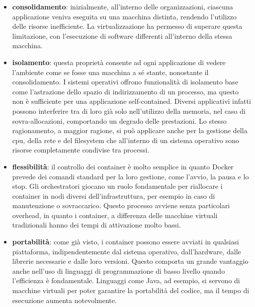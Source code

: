 \begin{itemize}
	\item \textbf{consolidamento}: inizialmente, all'interno delle organizzazioni, ciascuna applicazione veniva eseguita su una macchina distinta, rendendo l'utilizzo delle risorse inefficiente. La virtualizzazione ha permesso di superare questa limitazione, con l'esecuzione di software differenti all'interno della stessa macchina.
	\item \textbf{isolamento}: questa proprietà consente ad ogni applicazione di vedere l'ambiente come se fosse una macchina a sé stante, nonostante il consolidamento. I sistemi operativi offrono funzionalità di isolamento base come l'astrazione dello spazio di indirizzamento di un processo, ma questo non è sufficiente per una applicazione self-contained. Diversi applicativi infatti possono interferire tra di loro già solo nell'utilizzo della memoria, nel caso di sovra-allocazioni, comportando un degrado delle prestazioni. Lo stesso ragionamento, a maggior ragione, si può applicare anche per la gestione della cpu, della rete e del filesystem che all'interno di un sistema operativo sono risorse completamente condivise tra processi. 
	\item \textbf{flessibilità}: il controllo dei container è molto semplice in quanto Docker prevede dei comandi standard per la loro gestione, come l'avvio, la pausa e lo stop. Gli orchestratori giocano un ruolo fondamentale per riallocare i container in nodi diversi dell'infrastruttura, per esempio in caso di manutenzione o sovraccarico. Questo processo avviene senza particolari overhead, in quanto i container, a differenza delle macchine virtuali tradizionali hanno dei tempi di attivazione molto bassi.
	\item \textbf{portabilità}: come già visto, i container possono essere avviati in qualsiasi piattaforma, indipendentemente dal sistema operativo, dall'hardware, dalle librerie necessarie e dalle loro versioni. Questo comporta un grande vantaggio anche nell'uso di linguaggi di programmazione di basso livello quando l'efficienza è fondamentale. Linguaggi come Java, ad esempio, si servono di macchine virtuali per poter garantire la portabilità del codice, ma il tempo di esecuzione aumenta notevolmente. 
\end{itemize}

